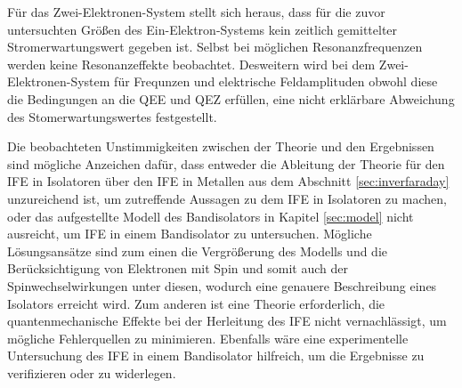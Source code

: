 Für das Zwei-Elektronen-System stellt sich heraus,
dass für die zuvor untersuchten
Größen des Ein-Elektron-Systems
kein zeitlich gemittelter
Stromerwartungswert gegeben ist.
Selbst bei möglichen Resonanzfrequenzen werden
keine Resonanzeffekte beobachtet.
Desweitern wird bei dem  Zwei-Elektronen-System
für Frequnzen und elektrische Feldamplituden obwohl  diese die Bedingungen an die QEE und QEZ erfüllen, eine nicht erklärbare Abweichung
des Stomerwartungswertes festgestellt.

Die beobachteten Unstimmigkeiten zwischen der Theorie und den Ergebnissen
 sind mögliche Anzeichen dafür, dass
entweder die
Ableitung der Theorie für den IFE in Isolatoren
über den IFE in Metallen aus dem Abschnitt \ref{sec:inverfaraday}
unzureichend ist, um zutreffende Aussagen zu dem IFE in Isolatoren zu machen, oder
das aufgestellte Modell des Bandisolators in Kapitel \ref{sec:model} nicht ausreicht,
um IFE in einem Bandisolator zu untersuchen.
Mögliche Lösungsansätze sind zum einen die Vergrößerung des Modells und die Berücksichtigung von
Elektronen mit Spin und somit auch der Spinwechselwirkungen unter diesen, wodurch eine
genauere Beschreibung eines Isolators erreicht wird.
Zum anderen ist eine Theorie erforderlich, die quantenmechanische Effekte bei der
Herleitung des IFE nicht vernachlässigt, um mögliche Fehlerquellen zu minimieren.
Ebenfalls wäre eine experimentelle Untersuchung des IFE in einem Bandisolator hilfreich,
um die Ergebnisse zu verifizieren oder zu widerlegen.

